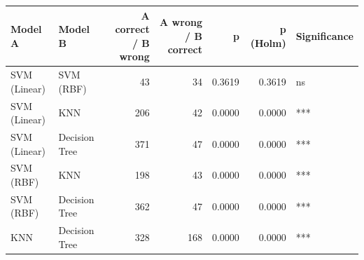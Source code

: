 \begin{tabular}{llrrrrl}
\toprule
Model A & Model B & A correct / B wrong & A wrong / B correct & p & p (Holm) & Significance \\
\midrule
SVM (Linear) & SVM (RBF) & 43 & 34 & 0.3619 & 0.3619 & ns \\
SVM (Linear) & KNN & 206 & 42 & 0.0000 & 0.0000 & *** \\
SVM (Linear) & Decision Tree & 371 & 47 & 0.0000 & 0.0000 & *** \\
SVM (RBF) & KNN & 198 & 43 & 0.0000 & 0.0000 & *** \\
SVM (RBF) & Decision Tree & 362 & 47 & 0.0000 & 0.0000 & *** \\
KNN & Decision Tree & 328 & 168 & 0.0000 & 0.0000 & *** \\
\bottomrule
\end{tabular}
